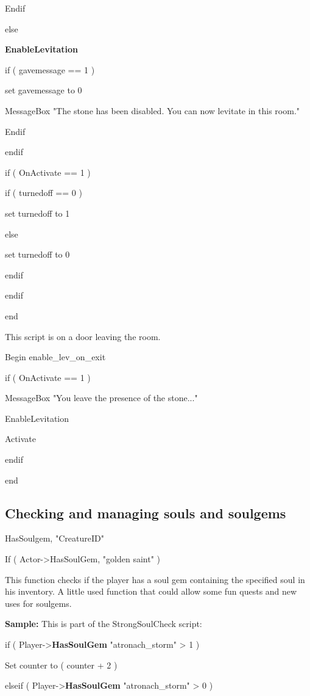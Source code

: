 \documentclass[
]{article}
\begin{document}
Endif

else

\textbf{EnableLevitation}

if ( gavemessage == 1 )

set gavemessage to 0

MessageBox "The stone has been disabled. You can now levitate in this
room."

Endif

endif

if ( OnActivate == 1 )

if ( turnedoff == 0 )

set turnedoff to 1

else

set turnedoff to 0

endif

endif

end

This script is on a door leaving the room.

Begin enable\_lev\_on\_exit

if ( OnActivate == 1 )

MessageBox "You leave the presence of the stone..."

EnableLevitation

Activate

endif

end

\hypertarget{checking-and-managing-souls-and-soulgems}{%
\subsection{Checking and managing souls and
soulgems}\label{checking-and-managing-souls-and-soulgems}}

HasSoulgem, "CreatureID"

If ( Actor-\textgreater HasSoulGem, "golden saint" )

This function checks if the player has a soul gem containing the
specified soul in his inventory. A little used function that could allow
some fun quests and new uses for soulgems.

\textbf{Sample:} This is part of the StrongSoulCheck script:

if ( Player-\textgreater{}\textbf{HasSoulGem} "atronach\_storm"
\textgreater{} 1 )

Set counter to ( counter + 2 )

elseif ( Player-\textgreater{}\textbf{HasSoulGem} "atronach\_storm"
\textgreater{} 0 )
\end{document}

